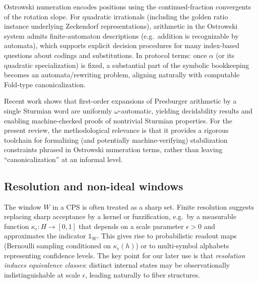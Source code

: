 \begin{remark}\label{rem:ostrowski-automaticity}
Ostrowski numeration encodes positions using the continued-fraction convergents of the rotation slope. For quadratic irrationals (including the golden ratio instance underlying Zeckendorf representations), arithmetic in the Ostrowski system admits finite-automaton descriptions (e.g.\ addition is recognizable by automata), which supports explicit decision procedures for many index-based questions about codings and substitutions.\cite{AlloucheShallit2003AutomaticSequences,HieronymiTerry2018OstrowskiAdditionAutomata} In protocol terms: once $\alpha$ (or its quadratic specialization) is fixed, a substantial part of the symbolic bookkeeping becomes an automata/rewriting problem, aligning naturally with computable Fold-type canonicalization.
\end{remark}

\begin{remark}\label{rem:sturmian-decidability}
Recent work shows that first-order expansions of Presburger arithmetic by a single Sturmian word are uniformly $\omega$-automatic, yielding decidability results and enabling machine-checked proofs of nontrivial Sturmian properties.\cite{HieronymiMaOeiSchaefferSchulzShallit2024DecidabilitySturmian} For the present review, the methodological relevance is that it provides a rigorous toolchain for formalizing (and potentially machine-verifying) stabilization constraints phrased in Ostrowski numeration terms, rather than leaving ``canonicalization'' at an informal level.
\end{remark}

\subsection{Resolution and non-ideal windows}\label{sec:readout:resolution}

The window $W$ in a CPS is often treated as a sharp set. Finite resolution suggests replacing sharp acceptance by a kernel or fuzzification, e.g.\ by a measurable function $\kappa_\epsilon : H\to[0,1]$ that depends on a scale parameter $\epsilon>0$ and approximates the indicator $\mathds{1}_W$. This gives rise to probabilistic readout maps (Bernoulli sampling conditioned on $\kappa_\epsilon(h)$) or to multi-symbol alphabets representing confidence levels. The key point for our later use is that \emph{resolution induces equivalence classes}: distinct internal states may be observationally indistinguishable at scale $\epsilon$, leading naturally to fiber structures.

